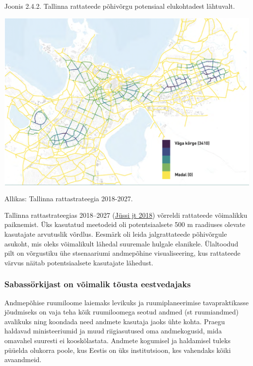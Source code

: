 \documentclass[estonian,]{article}
\begin{document}
{Joonis 2.4.2.} Tallinna rattateede põhivõrgu potensiaal elukohtadest lähtuvalt.

\begin{center}\includegraphics[width=0.9\linewidth]{figures/2-chapter/fig242} \end{center}
\begin{imgsource}
{Allikas:} Tallinna rattastrateegia 2018-2027.
\end{imgsource}

Tallinna rattastrateegias 2018--2027 (\protect\hyperlink{Juxfcssi2018}{Jüssi jt 2018}) võrreldi rattateede võimalikku paiknemist. Üks kasutatud meetodeid oli potentsiaalsete 500 m raadiuses olevate kasutajate arvutuslik võrdlus. Eesmärk oli leida jalgrattateede põhivõrgule asukoht, mis oleks võimalikult lähedal suuremale hulgale elanikele. Ülaltoodud pilt on võrgustiku ühe stsenaariumi andmepõhine visualiseering, kus rattateede värvus näitab potentsiaalsete kasutajate lähedust.

\hypertarget{sabassuxf6rkijast-on-vuxf5imalik-tuxf5usta-eestvedajaks}{%
\subsubsection*{Sabassörkijast on võimalik tõusta eestvedajaks}\label{sabassuxf6rkijast-on-vuxf5imalik-tuxf5usta-eestvedajaks}}

Andmepõhise ruumiloome laiemaks levikuks ja ruumiplaneerimise tavapraktikasse jõudmiseks on vaja teha kõik ruumiloomega seotud andmed (st ruumiandmed) avalikuks ning koondada need andmete kasutaja jaoks ühte kohta. Praegu haldavad ministeeriumid ja muud riigiasutused oma andmekogusid, mida omavahel suuresti ei kooskõlastata. Andmete kogumisel ja haldamisel tuleks püüelda olukorra poole, kus Eestis on üks institutsioon, kes vahendaks kõiki avaandmeid.
\end{document}
